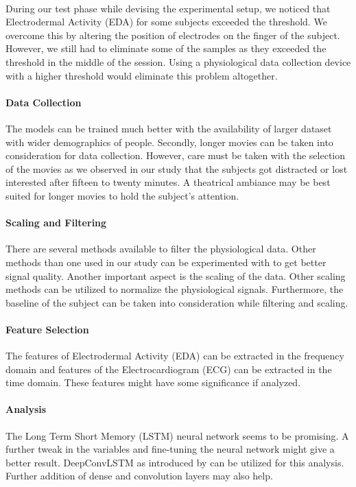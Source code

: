 \paragraph{} During our test phase while devising the experimental setup, we noticed that Electrodermal Activity (EDA) for some subjects exceeded the threshold. We overcome this by altering the position of electrodes on the finger of the subject. However, we still had to eliminate some of the samples as they exceeded the threshold in the middle of the session. Using a physiological data collection device with a higher threshold would eliminate this problem altogether.

\paragraph{Data Collection} The models can be trained much better with the availability of larger dataset with wider demographics of people. Secondly, longer movies can be taken into consideration for data collection. However, care must be taken with the selection of the movies as we observed in our study that the subjects got distracted or lost interested after fifteen to twenty minutes. A theatrical ambiance may be best suited for longer movies to hold the subject's attention.

\paragraph{Scaling and Filtering} There are several methods available to filter the physiological data. Other methods than one used in our study can be experimented with to get better signal quality. Another important aspect is the scaling of the data. Other scaling methods can be utilized to normalize the physiological signals. Furthermore, the baseline of the subject can be taken into consideration while filtering and scaling.

\paragraph{Feature Selection} The features of Electrodermal Activity (EDA) can be extracted in the frequency domain and features of the Electrocardiogram (ECG) can be extracted in the time domain. These features might have some significance if analyzed.

\paragraph{Analysis} The Long Term Short Memory (LSTM) neural network seems to be promising. A further tweak in the variables and fine-tuning the neural network might give a better result. DeepConvLSTM as introduced by \citeauthor{ordonez_deep_2016} can be utilized for this analysis. Further addition of dense and convolution layers may also help.

